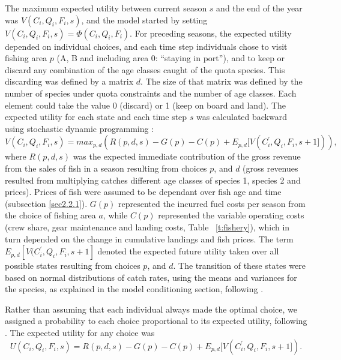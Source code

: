 \documentclass[12pt,oneline,a4paper,numbib]{ouparticle}
\numberwithin{equation}{subsection} %
\begin{document}
The maximum expected utility between current season $s$ and the end of the year was $V (C_i, Q_i, F_i, s)$, and the model started by setting $V (C_i, Q_i, F_i, s)= \Phi (C_i, Q_i, F_i)$. For preceding seasons, the expected utility depended on individual choices, and each time step individuals chose to visit fishing area $p$ (A, B and including area 0: “staying in port”), and to keep or discard any combination of the age classes caught of the quota species. This discarding was defined by a matrix $d$. The size of that matrix was defined by the number of species under quota constraints and the number of age classes. Each element could take the value 0 (discard) or 1 (keep on board and land). The expected utility for each state and each time step $s$ was calculated backward using stochastic dynamic programming \cite{ClarkandMangel2000}:
\begin{equation}
V (C_i, Q_i, F_i, s) = max_{p,d}( R(p, d, s)- G(p) - C(p) + E_{p, d}[V (C_i^\prime, Q_i, F_i, s+1])),
\end{equation}
where $R(p, d, s)$ was the expected immediate contribution of the gross revenue from the sales of fish in a season resulting from choices $p$, and $d$ (gross revenues resulted from multiplying catches different age classes of species 1, species 2 and prices). Prices of fish were assumed to be dependant over fish age and time (subsection \ref{sec2.2.1}). $G(p)$ represented the incurred fuel costs per season from the choice of fishing area $a$, while  $ C(p)$ represented the variable operating costs (crew share, gear maintenance and landing costs, Table ~\ref{t:fishery}), which in turn depended on the change in cumulative landings and fish prices. The term $E_{p, d}[V (C_i^\prime, Q_i, F_i, s+1]$ denoted the expected future utility taken over all possible states resulting from choices $p$, and $d$. The transition of these states were based on normal distributions of catch rates, using the means and variances for the species, as explained in the model conditioning section, following \cite{Poos2010}.

Rather than assuming that each individual always made the optimal choice, we assigned a probability to each choice proportional to its expected utility, following \cite{Dowling2011}. The expected utility for any choice was
\begin{equation}
U (C_i, Q_i, F_i, s) = R(p, d, s)- G(p) - C(p) + E_{p, d}[V (C_i^\prime, Q_i, F_i, s+1]).
\end{equation}
\end{document}
